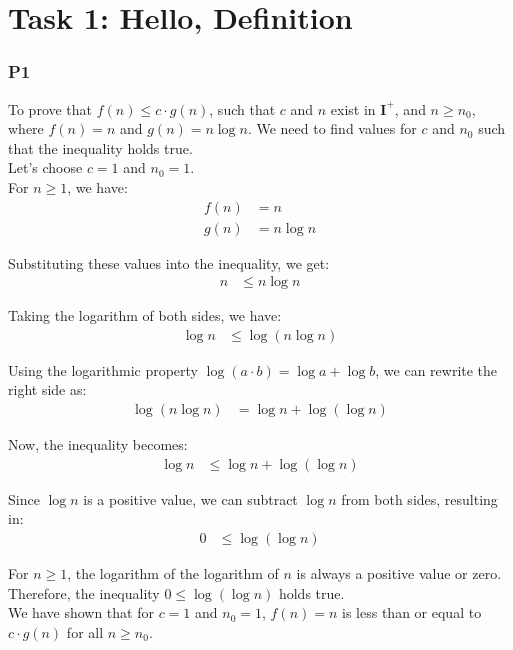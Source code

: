 \chapter{Task 1: Hello, Definition}

\small \subsection*{P1}
To prove that $f(n) \leq c \cdot g(n)$, such that $c$ and $n$ exist in $\mathbf{I}^+$, and $n \geq n_0$, where $f(n) = n$ and $g(n) = n \log n$.
We need to find values for $c$ and $n_0$ such that the inequality holds true.\\

Let's choose $c = 1$ and $n_0 = 1$.\\

For $n \geq 1$, we have: 
\begin{align*}
f(n) &= n \\
g(n) &= n \log n
\end{align*}

Substituting these values into the inequality, we get:
\begin{align*}
n &\leq n \log n
\end{align*}

Taking the logarithm of both sides, we have:
\begin{align*}
\log n &\leq \log(n \log n)
\end{align*}

Using the logarithmic property $\log(a \cdot b) = \log a + \log b$, we can rewrite the right side as:
\begin{align*}
\log(n \log n) &= \log n + \log(\log n)
\end{align*}

Now, the inequality becomes:
\begin{align*}
\log n &\leq \log n + \log(\log n)
\end{align*}

Since $\log n$ is a positive value, we can subtract $\log n$ from both sides, resulting in:
\begin{align*}
0 &\leq \log(\log n)
\end{align*}

For $n \geq 1$, the logarithm of the logarithm of $n$ is always a positive value or zero. Therefore, the inequality $0 \leq \log(\log n)$ holds true.\\

We have shown that for $c = 1$ and $n_0 = 1$, $f(n) = n$ is less than or equal to $c \cdot g(n)$ for all $n \geq n_0$.\\

